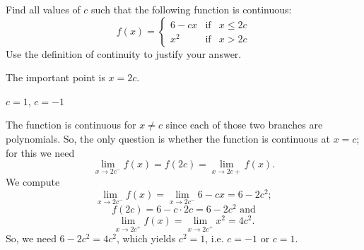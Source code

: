 \begin{question}[2015Q]
Find all values of $c$ such that the following function is continuous:
\[f(x)=\left\{\begin{array}{ccc}
6-cx & \text{if} & x\le 2c\\
x^2 &  \text{if} & x> 2c
\end{array}\right.\]Use the definition of continuity to justify your answer.
\end{question}
\begin{hint} The important point is $x=2c$.
\end{hint}
\begin{answer} $c=1$, $c=-1$
\end{answer}
\begin{solution} The function is continuous for $x\ne c$ since each of those two branches are
polynomials. So, the only question is whether the function is continuous at
$x=c$; for this we need
$$\lim_{x\to 2c^-}f(x)=f(2c)=\lim_{x\to 2c+}f(x).$$
We compute
$$\lim_{x\to 2c^-}f(x)=\lim_{x\to 2c^-}6-cx = 6-2c^2;$$
$$f(2c)=6-c\cdot 2c= 6-2c^2\text{ and}$$
$$\lim_{x\to 2c^+}f(x)=\lim_{x\to 2c^+}x^2=4c^2.$$
So, we need $6-2c^2=4c^2$, which yields $c^2=1$, i.e. $c=-1$ or $c=1$.
\end{solution}


\subsection*{\Application}

